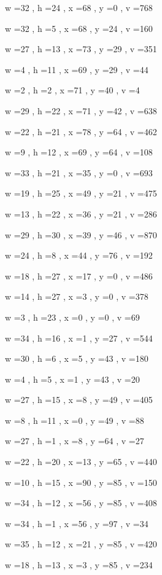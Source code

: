 \documentclass[11pt]{article}
\begin{document}
w =32 , h =24 , x =68 , y =0 , v =768
\par
w =32 , h =5 , x =68 , y =24 , v =160
\par
w =27 , h =13 , x =73 , y =29 , v =351
\par
w =4 , h =11 , x =69 , y =29 , v =44
\par
w =2 , h =2 , x =71 , y =40 , v =4
\par
w =29 , h =22 , x =71 , y =42 , v =638
\par
w =22 , h =21 , x =78 , y =64 , v =462
\par
w =9 , h =12 , x =69 , y =64 , v =108
\par
w =33 , h =21 , x =35 , y =0 , v =693
\par
w =19 , h =25 , x =49 , y =21 , v =475
\par
w =13 , h =22 , x =36 , y =21 , v =286
\par
w =29 , h =30 , x =39 , y =46 , v =870
\par
w =24 , h =8 , x =44 , y =76 , v =192
\par
w =18 , h =27 , x =17 , y =0 , v =486
\par
w =14 , h =27 , x =3 , y =0 , v =378
\par
w =3 , h =23 , x =0 , y =0 , v =69
\par
w =34 , h =16 , x =1 , y =27 , v =544
\par
w =30 , h =6 , x =5 , y =43 , v =180
\par
w =4 , h =5 , x =1 , y =43 , v =20
\par
w =27 , h =15 , x =8 , y =49 , v =405
\par
w =8 , h =11 , x =0 , y =49 , v =88
\par
w =27 , h =1 , x =8 , y =64 , v =27
\par
w =22 , h =20 , x =13 , y =65 , v =440
\par
w =10 , h =15 , x =90 , y =85 , v =150
\par
w =34 , h =12 , x =56 , y =85 , v =408
\par
w =34 , h =1 , x =56 , y =97 , v =34
\par
w =35 , h =12 , x =21 , y =85 , v =420
\par
w =18 , h =13 , x =3 , y =85 , v =234
\par
\newpage
\end{document}
